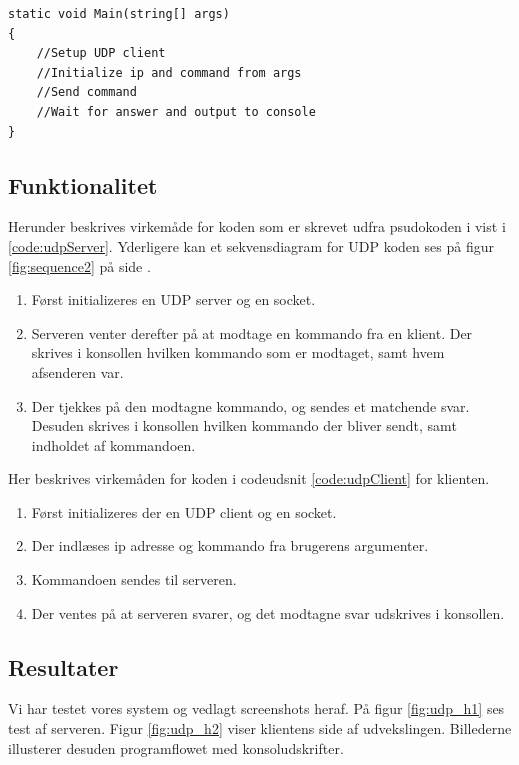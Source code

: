 \begin{lstlisting}[caption = Hoveddesign for client,label=code:udpClient]
static void Main(string[] args)
{
	//Setup UDP client
	//Initialize ip and command from args
	//Send command
	//Wait for answer and output to console
}
\end{lstlisting}

\subsection{Funktionalitet}
Herunder beskrives virkemåde for koden som er skrevet udfra psudokoden i vist i \ref{code:udpServer}. Yderligere kan et sekvensdiagram for UDP koden ses på figur \ref{fig:sequence2} på side \pageref{fig:sequence2}.

\begin{enumerate}
	\item Først initializeres en UDP server og en socket.
	\item Serveren venter derefter på at modtage en kommando fra en klient. Der skrives i konsollen hvilken
	kommando som er modtaget, samt hvem afsenderen var.
	\item Der tjekkes på den modtagne kommando, og sendes et matchende svar. Desuden skrives i konsollen
	hvilken kommando der bliver sendt, samt indholdet af kommandoen.
\end{enumerate}

Her beskrives virkemåden for koden i codeudsnit \ref{code:udpClient} for klienten.

\begin{enumerate}
	\item Først initializeres der en UDP client og en socket.
	\item Der indlæses ip adresse og kommando fra brugerens argumenter.
	\item Kommandoen sendes til serveren.
	\item Der ventes på at serveren svarer, og det modtagne svar udskrives i konsollen.
\end{enumerate}

\subsection{Resultater}
Vi har testet vores system og vedlagt screenshots heraf. På figur \ref{fig:udp_h1} ses test af serveren. Figur \ref{fig:udp_h2} viser klientens side af udvekslingen. Billederne illusterer desuden programflowet med konsoludskrifter.

